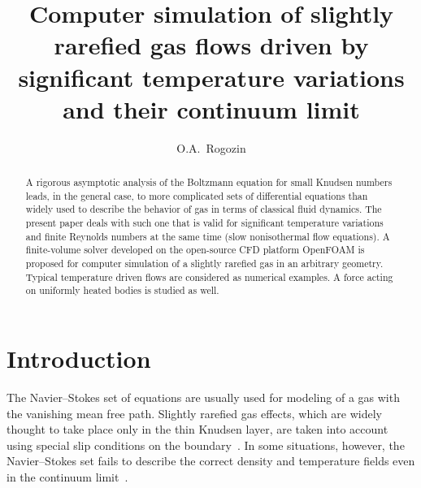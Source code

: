 \documentclass[smallextended]{svjour3} %
\begin{document}
\title{
    Computer simulation of slightly rarefied gas flows driven by significant temperature variations and their continuum limit
}

\author{O.A.~Rogozin}

\maketitle

\begin{abstract}
    A rigorous asymptotic analysis of the Boltzmann equation for small Knudsen numbers
    leads, in the general case, to more complicated sets of differential equations
    than widely used to describe the behavior of gas in terms of classical fluid dynamics.
    The present paper deals with such one that is valid for significant temperature variations
    and finite Reynolds numbers at the same time (slow nonisothermal flow equations).
    A finite-volume solver developed on the open-source CFD platform OpenFOAM\textregistered{}
    is proposed for computer simulation of a slightly rarefied gas in an arbitrary geometry.
    Typical temperature driven flows are considered as numerical examples.
    A force acting on uniformly heated bodies is studied as well.
\end{abstract}

\section{Introduction}

The Navier--Stokes set of equations are usually used for modeling of a gas with the vanishing mean free path.
Slightly rarefied gas effects, which are widely thought to take place only in the thin Knudsen layer,
are taken into account using special slip conditions on the boundary~\cite{SharipovCoefficients}.
In some situations, however, the Navier--Stokes set fails to describe the correct density
and temperature fields even in the continuum limit~\cite{Kogan1976}.
\end{document}
